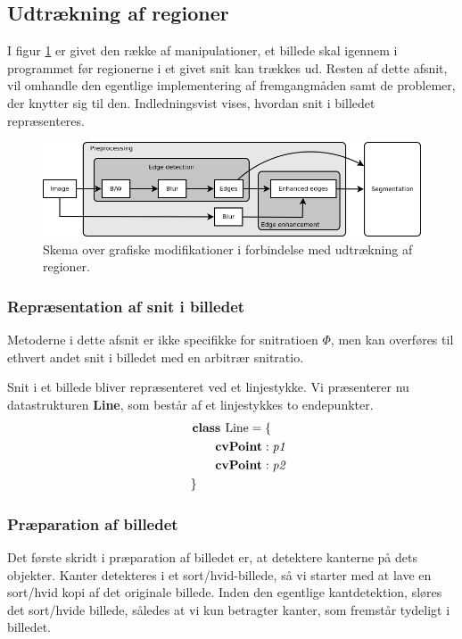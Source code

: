 {\subsection{Udtrækning af regioner}
I figur \ref{graphic_pipeline} er givet den række af manipulationer, et
billede skal igennem i programmet før regionerne i et givet snit kan
trækkes ud.  Resten af dette afsnit, vil omhandle den egentlige
implementering af fremgangmåden samt de problemer, der knytter sig til
den. Indledningsvist vises, hvordan snit i billedet repræsenteres.
\begin{figure}[!h]
    \includegraphics[width=\textwidth]{afsnit/implementation/billeder/billedbehandling/pipeline.png}
    \caption{Skema over grafiske modifikationer i forbindelse med
    udtrækning af regioner.}
    \label{graphic_pipeline}
\end{figure}

\subsubsection{Repræsentation af snit i billedet}
Metoderne i dette afsnit er ikke specifikke for snitratioen $\varPhi$,
men kan overføres til ethvert andet snit i billedet med en arbitrær
snitratio.

Snit i et billede bliver repræsenteret ved et linjestykke. Vi
præsenterer nu datastrukturen \textbf{Line}, som består af et
linjestykkes to endepunkter.
\begin{multline}
    \textbf{class~} \textrm{Line} = \{ \\
    \shoveleft{\qquad\textbf{cvPoint} : \textit{p1}} \\
    \shoveleft{\qquad\textbf{cvPoint} : \textit{p2}} \\
    \shoveleft{\}}\shoveright{}
    \label{Line_class}
\end{multline}

\subsubsection{Præparation af billedet}
Det første skridt i præparation af billedet er, at detektere kanterne på
dets objekter.  Kanter detekteres i et sort/hvid-billede, så vi starter
med at lave en sort/hvid kopi af det originale billede. Inden den
egentlige kantdetektion, sløres det sort/hvide billede, således at vi
kun betragter kanter, som fremstår tydeligt i billedet.

}
